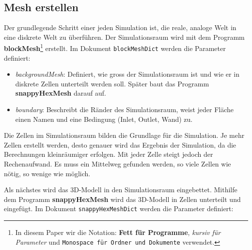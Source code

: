 \subsection{Mesh erstellen \label{openfoam:section:Mesh erstellen}}
Der grundlegende Schritt einer jeden Simulation ist, die reale, analoge Welt in eine diskrete Welt zu überführen.
Der Simulationsraum wird mit dem Programm \textbf{blockMesh}\footnote{In diesem Paper wir die Notation: \textbf{Fett für Programme}, \textit{kursiv für Parameter} und \texttt{Monospace für Ordner und Dokumente} verwendet.} 
erstellt.
%
Im Dokument \texttt{blockMeshDict} werden die Parameter definiert:

\begin{itemize}
    \item \textit{backgroundMesh}: Definiert, wie gross der Simulationsraum ist und wie er in diskrete Zellen unterteilt werden soll. Später baut das Programm \textbf{snappyHexMesh} darauf auf.
%
    \item \textit{boundary}: Beschreibt die Ränder des Simulationsraum, weist jeder Fläche einen Namen und eine Bedingung (Inlet, Outlet, Wand) zu.
%
\end{itemize}
Die Zellen im Simulationsraum bilden die Grundlage für die Simulation. 
Je mehr Zellen erstellt werden, desto genauer wird das Ergebnis der Simulation, da die Berechnungen kleinräumiger erfolgen.
Mit jeder Zelle steigt jedoch der Rechenaufwand.
Es muss ein Mittelweg gefunden werden, so viele Zellen wie nötig, so wenige wie möglich.

Als nächstes wird das 3D-Modell in den Simulationsraum eingebettet.
Mithilfe dem Programm \textbf{snappyHexMesh} wird das 3D-Modell in  Zellen unterteilt und eingefügt. 
%
Im Dokument \texttt{snappyHexMeshDict} werden die Parameter definiert:
%

